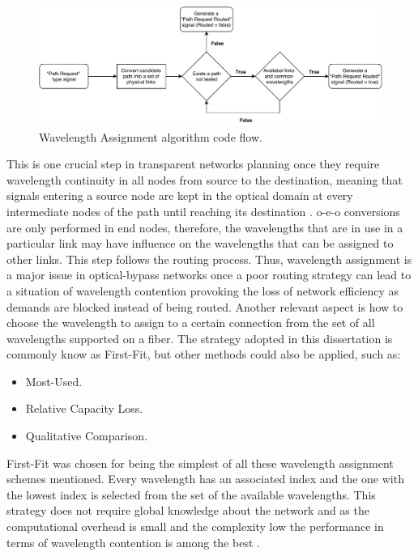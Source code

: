 \begin{figure}[H]
  \begin{center}
    \includegraphics[width=1 \textwidth]{fig/logos/wavelengthAssignment.pdf}
    \caption{Wavelength Assignment algorithm code flow.}
  \end{center}
\end{figure}

This is one crucial step in transparent networks planning once they require wavelength continuity in all nodes from source to the destination, meaning that signals entering a source node are kept in the optical domain at every intermediate nodes of the path until reaching its destination \cite{SimmonsJane2008}. \gls{o-e-o} conversions are only performed in end nodes, therefore, the wavelengths that are in use in a particular link may have influence on the wavelengths that can be assigned to other links. This step follows the routing process. Thus, wavelength assignment is a major issue in optical-bypass networks once a poor routing strategy can lead to a situation of wavelength contention provoking the loss of network efficiency as demands are blocked instead of being routed. Another relevant aspect is how to choose the wavelength to assign to a certain connection from the set of all wavelengths supported on a fiber. The strategy adopted in this dissertation is commonly know as First-Fit\cite{SimmonsJane2008}, but other methods could also be applied, such as:
\begin{itemize}
  \item Most-Used.
  \item Relative Capacity Loss.
  \item Qualitative Comparison.
\end{itemize}
First-Fit was chosen for being the simplest of all these wavelength assignment schemes mentioned. Every wavelength has an associated index and the one with the lowest index is selected from the set of the available wavelengths. This strategy does not require global knowledge about the network and as the computational overhead is small and the complexity low the performance in terms of wavelength contention is among the best \cite{fisrtFit}.

